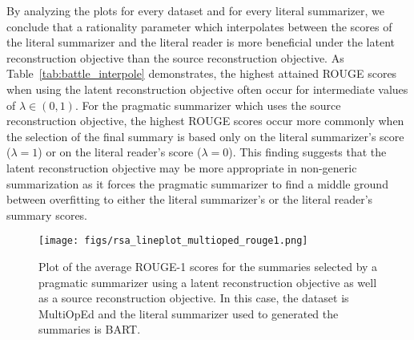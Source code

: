 \documentclass[11pt]{article}
\begin{document}
By analyzing the plots for every dataset and for every literal summarizer, we conclude that a rationality parameter which interpolates between the scores of the literal summarizer and the literal reader is more beneficial under the latent reconstruction objective than the source reconstruction objective. As Table~\ref{tab:battle_interpole} demonstrates, the highest attained ROUGE scores when using the latent reconstruction objective often occur for intermediate values of $\lambda \in (0,1)$. For the pragmatic summarizer which uses the source reconstruction objective, the highest ROUGE scores occur more commonly when the selection of the final summary is based only on the literal summarizer's score ($\lambda = 1$) or on the literal reader's score ($\lambda = 0$). This finding suggests that the latent reconstruction objective may be more appropriate in non-generic summarization as it forces the pragmatic summarizer to find a middle ground between overfitting to either the literal summarizer's or the literal reader's summary scores.

\begin{figure}
    \centering
    \texttt{[image: figs/rsa\_lineplot\_multioped\_rouge1.png]}
    \caption{Plot of the average ROUGE-1 scores for the summaries selected by a pragmatic summarizer using a latent reconstruction objective as well as a source reconstruction objective. In this case, the dataset is MultiOpEd and the literal summarizer used to generated the summaries is BART.}
    \label{fig:line_plot}
\end{figure}
\end{document}

